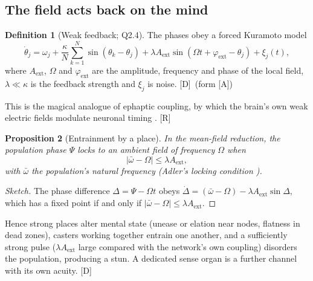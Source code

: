 \documentclass[11pt,a4paper]{article}
\numberwithin{equation}{section}
\theoremstyle{definition}
\newtheorem{definition}{Definition}[section]
\theoremstyle{plain}
\newtheorem{proposition}[definition]{Proposition}
\theoremstyle{remark}
\newcommand{\abs}[1]{\left\lvert #1\right\rvert}
\newcommand{\tagD}{\textcolor{tag}{\textsf{[D]}}}
\newcommand{\tagR}{\textcolor{tag}{\textsf{[R]}}}
\newcommand{\tagA}{\textcolor{tag}{\textsf{[A]}}}
\begin{document}
\subsection{The field acts back on the mind}
\begin{definition}[Weak feedback; Q2.4]
The phases obey a forced Kuramoto model
\begin{equation}\label{eq:kuramoto}
\dot\theta_j=\omega_j+\frac{\kappa}{N}\sum_{k=1}^N\sin(\theta_k-\theta_j)+\lambda A_{\text{ext}}\sin(\Omega t+\varphi_{\text{ext}}-\theta_j)+\xi_j(t),
\end{equation}
where $A_{\text{ext}}$, $\Omega$ and $\varphi_{\text{ext}}$ are the amplitude, frequency and phase of the local field, $\lambda\ll\kappa$ is the feedback strength and $\xi_j$ is noise. \tagD\ (form \tagA)
\end{definition}
This is the magical analogue of ephaptic coupling, by which the brain's own weak electric fields modulate neuronal timing \cite{anastassiou,frohlich}. \tagR
\begin{proposition}[Entrainment by a place]\label{prop:entrain}
In the mean-field reduction, the population phase $\Psi$ locks to an ambient field of frequency $\Omega$ when
\begin{equation}
\abs{\bar\omega-\Omega}\le \lambda A_{\text{ext}},
\end{equation}
with $\bar\omega$ the population's natural frequency (Adler's locking condition \cite{adler}).
\end{proposition}
\begin{proof}[Sketch]
The phase difference $\Delta=\Psi-\Omega t$ obeys $\dot\Delta=(\bar\omega-\Omega)-\lambda A_{\text{ext}}\sin\Delta$, which has a fixed point if and only if $\abs{\bar\omega-\Omega}\le\lambda A_{\text{ext}}$.
\end{proof}
Hence strong places alter mental state (unease or elation near nodes, flatness in dead zones), casters working together entrain one another, and a sufficiently strong pulse ($\lambda A_{\text{ext}}$ large compared with the network's own coupling) disorders the population, producing a stun. A dedicated sense organ is a further channel with its own acuity. \tagD
\end{document}
